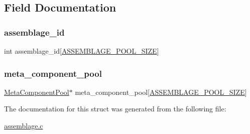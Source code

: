 \subsection{Field Documentation}
\mbox{\label{struct_assemblage_pool_ae15fe47459f6c895149f5153965c7570}} 
\subsubsection{\texorpdfstring{assemblage\+\_\+id}{assemblage\_id}}
{\footnotesize\ttfamily int assemblage\+\_\+id\mbox{[}\mbox{\hyperlink{assemblage_8c_a7278dc587e6d944803677e7662c25147}{A\+S\+S\+E\+M\+B\+L\+A\+G\+E\+\_\+\+P\+O\+O\+L\+\_\+\+S\+I\+ZE}}\mbox{]}}

\mbox{\label{struct_assemblage_pool_a84508fb56f488124e510895704581e33}} 
\subsubsection{\texorpdfstring{meta\+\_\+component\+\_\+pool}{meta\_component\_pool}}
{\footnotesize\ttfamily \mbox{\hyperlink{struct_meta_component_pool}{Meta\+Component\+Pool}}$\ast$ meta\+\_\+component\+\_\+pool\mbox{[}\mbox{\hyperlink{assemblage_8c_a7278dc587e6d944803677e7662c25147}{A\+S\+S\+E\+M\+B\+L\+A\+G\+E\+\_\+\+P\+O\+O\+L\+\_\+\+S\+I\+ZE}}\mbox{]}}



The documentation for this struct was generated from the following file\+:\begin{DoxyCompactItemize}
\item 
\mbox{\hyperlink{assemblage_8c}{assemblage.\+c}}\end{DoxyCompactItemize}
